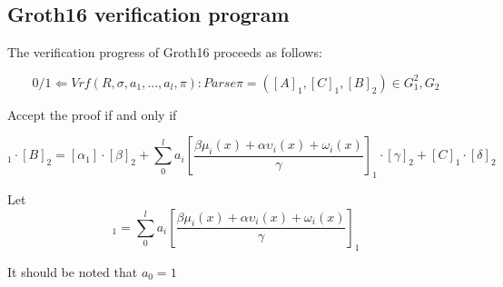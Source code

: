 \subsection{Groth16 verification program}

The verification progress of Groth16\cite{website:Groth16} proceeds as follows:

\begin{equation}
0/1 \Leftarrow Vrf(R,\sigma, a_{1},...,a_{l}, \pi): Parse \pi = ([A]_{1}, [C]_{1}, [B]_{2}) \in G_1^2, G_2
\end{equation}

Accept the proof if and only if

\begin{equation}
 [A]_1 \cdot [B]_2 = [\alpha_1] \cdot [\beta]_2 + \sum_{0}^{l}a_i[\frac{\beta\mu_i(x) + \alpha\upsilon_i(x) + \omega_i(x)}{\gamma}]_1 \cdot [\gamma]_2 + [C]_1 \cdot [\delta]_2  
\end{equation}


Let \begin{equation}  [msm]_1 = \sum_{0}^{l}a_i[\frac{\beta\mu_i(x) + \alpha\upsilon_i(x) + \omega_i(x)}{\gamma}]_1 \end{equation}



It should be noted that $a_0 = 1$ 
